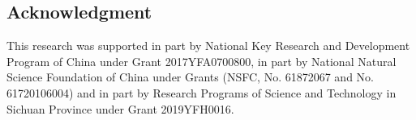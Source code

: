 \documentclass[runningheads]{llncs}
\begin{document}
\subsection*{Acknowledgment}
This research was supported in part by National Key Research and Development Program of China under Grant 2017YFA0700800, in part by National Natural Science Foundation of China under Grants (NSFC, No. 61872067 and No. 61720106004) and in part by Research Programs of Science and Technology in Sichuan Province under Grant 2019YFH0016.






\end{document}
